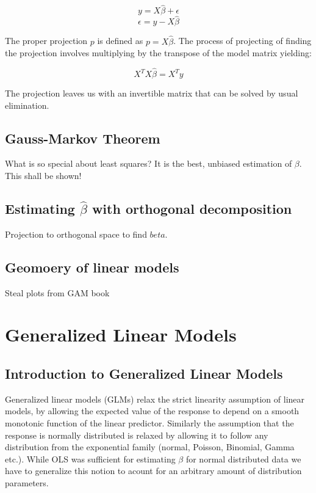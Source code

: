 \documentclass{article}
\begin{document}
    \begin{equation} y = X\widehat{\beta} + \epsilon  \end{equation}
    \begin{equation} \epsilon = y-X\widehat{\beta} \end{equation}

    The proper projection $p$ is defined as $p = X\widehat{\beta}$. The process of projecting of finding the projection involves multiplying by the transpose of the model matrix yielding:

    \begin{equation} X^T X \widehat{\beta} = X^T y  \end{equation}

    The projection leaves us with an invertible matrix that can be solved by usual elimination.





    \subsection{Gauss-Markov Theorem}
    What is so special about least squares? It is the best, unbiased estimation of $\beta$. This shall be shown!
    \subsection{Estimating $\widehat{\beta}$ with orthogonal decomposition}
    Projection to orthogonal space to find $beta$.
    \subsection{Geomoery of linear models}
    Steal plots from GAM book

    \section{Generalized Linear Models}
    \subsection{Introduction to Generalized Linear Models}
    Generalized linear models (GLMs) relax the strict linearity assumption of linear models, by allowing the expected value of the response to depend on a smooth monotonic function of the linear predictor. Similarly the assumption that the response is normally distributed is relaxed by allowing it to follow any distribution from the exponential family (normal, Poisson, Binomial, Gamma etc.). While OLS was sufficient for estimating $\beta$ for normal distributed data we have to generalize this notion to acount for an arbitrary amount of distribution parameters.
\end{document}
